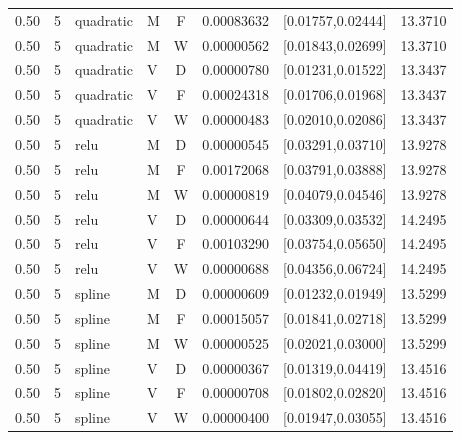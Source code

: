 \begin{longtable}{rrllcrrr}
0.50 & 5 & quadratic & M & F & 0.00083632 & [0.01757,0.02444] & 13.3710 \\

0.50 & 5 & quadratic & M & W & 0.00000562 & [0.01843,0.02699] & 13.3710 \\

0.50 & 5 & quadratic & V & D & 0.00000780 & [0.01231,0.01522] & 13.3437 \\

0.50 & 5 & quadratic & V & F & 0.00024318 & [0.01706,0.01968] & 13.3437 \\

0.50 & 5 & quadratic & V & W & 0.00000483 & [0.02010,0.02086] & 13.3437 \\

0.50 & 5 & relu & M & D & 0.00000545 & [0.03291,0.03710] & 13.9278 \\

0.50 & 5 & relu & M & F & 0.00172068 & [0.03791,0.03888] & 13.9278 \\

0.50 & 5 & relu & M & W & 0.00000819 & [0.04079,0.04546] & 13.9278 \\

0.50 & 5 & relu & V & D & 0.00000644 & [0.03309,0.03532] & 14.2495 \\

0.50 & 5 & relu & V & F & 0.00103290 & [0.03754,0.05650] & 14.2495 \\

0.50 & 5 & relu & V & W & 0.00000688 & [0.04356,0.06724] & 14.2495 \\

0.50 & 5 & spline & M & D & 0.00000609 & [0.01232,0.01949] & 13.5299 \\

0.50 & 5 & spline & M & F & 0.00015057 & [0.01841,0.02718] & 13.5299 \\

0.50 & 5 & spline & M & W & 0.00000525 & [0.02021,0.03000] & 13.5299 \\

0.50 & 5 & spline & V & D & 0.00000367 & [0.01319,0.04419] & 13.4516 \\

0.50 & 5 & spline & V & F & 0.00000708 & [0.01802,0.02820] & 13.4516 \\

0.50 & 5 & spline & V & W & 0.00000400 & [0.01947,0.03055] & 13.4516 \\


\end{longtable}

